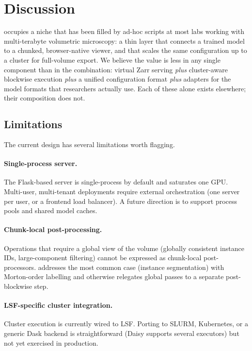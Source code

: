 \section{Discussion}
\label{sec:discussion}

\cellmapflow{} occupies a niche that has been filled by ad-hoc scripts at most labs working with multi-terabyte volumetric microscopy: a thin layer that connects a trained model to a chunked, browser-native viewer, and that scales the same configuration up to a cluster for full-volume export. We believe the value is less in any single component than in the combination: virtual Zarr serving \emph{plus} cluster-aware blockwise execution \emph{plus} a unified configuration format \emph{plus} adapters for the model formats that researchers actually use. Each of these alone exists elsewhere; their composition does not.

\subsection*{Limitations}

The current design has several limitations worth flagging.

\paragraph{Single-process server.} The Flask-based server is single-process by default and saturates one GPU. Multi-user, multi-tenant deployments require external orchestration (one server per user, or a frontend load balancer). A future direction is to support process pools and shared model caches.

\paragraph{Chunk-local post-processing.} Operations that require a global view of the volume (globally consistent instance IDs, large-component filtering) cannot be expressed as chunk-local post-processors. \cellmapflow{} addresses the most common case (instance segmentation) with Morton-order labelling and otherwise relegates global passes to a separate post-blockwise step.

\paragraph{LSF-specific cluster integration.} Cluster execution is currently wired to LSF. Porting to SLURM, Kubernetes, or a generic Dask backend is straightforward (Daisy supports several executors) but not yet exercised in production.

